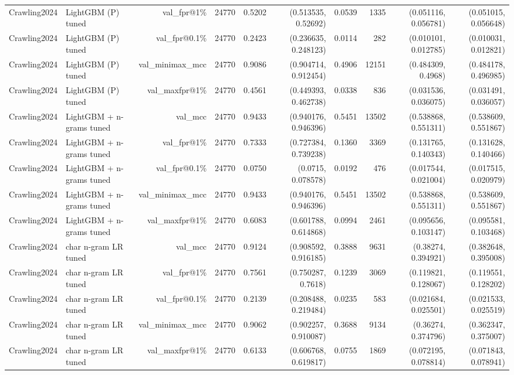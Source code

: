 \begin{table}[t]
\begin{tabular}{llrrrrrrrr}
Crawling2024 & LightGBM (P) tuned & val\_fpr@1\% & 24770 & 0.5202 & (0.513535, 0.52692) & 0.0539 & 1335 & (0.051116, 0.056781) & (0.051015, 0.056648) \\
Crawling2024 & LightGBM (P) tuned & val\_fpr@0.1\% & 24770 & 0.2423 & (0.236635, 0.248123) & 0.0114 & 282 & (0.010101, 0.012785) & (0.010031, 0.012821) \\
Crawling2024 & LightGBM (P) tuned & val\_minimax\_mcc & 24770 & 0.9086 & (0.904714, 0.912454) & 0.4906 & 12151 & (0.484309, 0.4968) & (0.484178, 0.496985) \\
Crawling2024 & LightGBM (P) tuned & val\_maxfpr@1\% & 24770 & 0.4561 & (0.449393, 0.462738) & 0.0338 & 836 & (0.031536, 0.036075) & (0.031491, 0.036057) \\
Crawling2024 & LightGBM + n-grams tuned & val\_mcc & 24770 & 0.9433 & (0.940176, 0.946396) & 0.5451 & 13502 & (0.538868, 0.551311) & (0.538609, 0.551867) \\
Crawling2024 & LightGBM + n-grams tuned & val\_fpr@1\% & 24770 & 0.7333 & (0.727384, 0.739238) & 0.1360 & 3369 & (0.131765, 0.140343) & (0.131628, 0.140466) \\
Crawling2024 & LightGBM + n-grams tuned & val\_fpr@0.1\% & 24770 & 0.0750 & (0.0715, 0.078578) & 0.0192 & 476 & (0.017544, 0.021004) & (0.017515, 0.020979) \\
Crawling2024 & LightGBM + n-grams tuned & val\_minimax\_mcc & 24770 & 0.9433 & (0.940176, 0.946396) & 0.5451 & 13502 & (0.538868, 0.551311) & (0.538609, 0.551867) \\
Crawling2024 & LightGBM + n-grams tuned & val\_maxfpr@1\% & 24770 & 0.6083 & (0.601788, 0.614868) & 0.0994 & 2461 & (0.095656, 0.103147) & (0.095581, 0.103468) \\
Crawling2024 & char n-gram LR tuned & val\_mcc & 24770 & 0.9124 & (0.908592, 0.916185) & 0.3888 & 9631 & (0.38274, 0.394921) & (0.382648, 0.395008) \\
Crawling2024 & char n-gram LR tuned & val\_fpr@1\% & 24770 & 0.7561 & (0.750287, 0.7618) & 0.1239 & 3069 & (0.119821, 0.128067) & (0.119551, 0.128202) \\
Crawling2024 & char n-gram LR tuned & val\_fpr@0.1\% & 24770 & 0.2139 & (0.208488, 0.219484) & 0.0235 & 583 & (0.021684, 0.025501) & (0.021533, 0.025519) \\
Crawling2024 & char n-gram LR tuned & val\_minimax\_mcc & 24770 & 0.9062 & (0.902257, 0.910087) & 0.3688 & 9134 & (0.36274, 0.374796) & (0.362347, 0.375007) \\
Crawling2024 & char n-gram LR tuned & val\_maxfpr@1\% & 24770 & 0.6133 & (0.606768, 0.619817) & 0.0755 & 1869 & (0.072195, 0.078814) & (0.071843, 0.078941) \\

\end{tabular}
\end{table}
